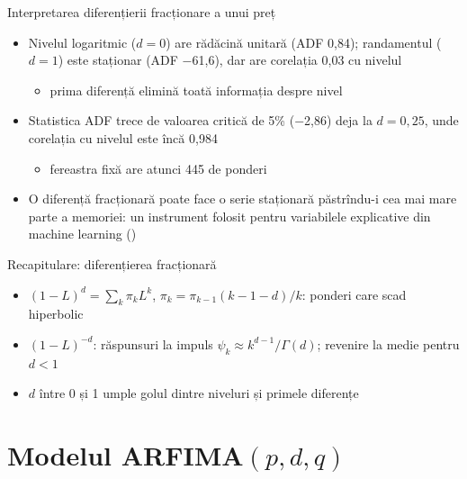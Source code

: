 \begin{frame}{Interpretarea diferențierii fracționare a unui preț}
\itemsize{\small}
\begin{itemize}
    \item Nivelul logaritmic ($d = 0$) are rădăcină unitară (ADF 0{,}84); randamentul ($d = 1$) este staționar (ADF $-$61{,}6), dar are corelația 0{,}03 cu nivelul
    \begin{itemize}
        \item prima diferență elimină toată informația despre nivel
    \end{itemize}
    \item Statistica ADF trece de valoarea critică de 5\% ($-$2{,}86) deja la $d = 0{,}25$, unde corelația cu nivelul este încă 0{,}984
    \begin{itemize}
        \item fereastra fixă are atunci 445 de ponderi
    \end{itemize}
    \item O diferență fracționară poate face o serie staționară păstrîndu-i cea mai mare parte a memoriei: un instrument folosit pentru variabilele explicative din machine learning ()
\end{itemize}
\end{frame}

\begin{frame}{Recapitulare: diferențierea fracționară}
\itemsize{\small}
\begin{itemize}
    \item $(1-L)^d = \sum_k\pi_k L^k$, $\pi_k = \pi_{k-1}(k-1-d)/k$: ponderi care scad hiperbolic
    \item $(1-L)^{-d}$: răspunsuri la impuls $\psi_k \approx k^{d-1}/\Gamma(d)$; revenire la medie pentru $d < 1$
    \item $d$ între 0 și 1 umple golul dintre niveluri și primele diferențe
\end{itemize}
\end{frame}


\section{Modelul ARFIMA$(p,d,q)$}

